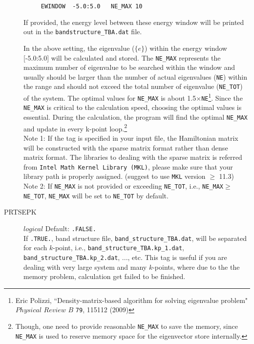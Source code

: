 \documentclass[a4paper,12pt]{scrartcl}
\makeatletter
\def\namedlabel#1#2{\begingroup
    #2%
    \def\@currentlabel{#2}%
    \phantomsection\label{#1}\endgroup
}
\makeatother
\begin{document}
\begin{description}
    \begin{verbatim}
     EWINDOW  -5.0:5.0   NE_MAX 10  
    \end{verbatim}

		If provided, the energy level between these energy window will be printed
		out in the \texttt{bandstructure\_TBA.dat} file. 

		In the above setting, the eigenvalue ($\{e\}$) within the energy window [-5.0:5.0] will be calculated and stored. The \texttt{NE\_MAX} represents the maximum number of eigenvalue to be searched within the window and usually should be larger than the number of actual eigenvalues (\texttt{NE}) within the range and should not exceed the total number of eigenvalue (\texttt{NE\_TOT}) of the system. The optimal values for \texttt{NE\_MAX} is about 1.5$\times$\texttt{NE}\footnote{Eric Polizzi, ``Density-matrix-based algorithm for solving eigenvalue problem" $Physical$ $Review$ $B$  \texttt{79}, 115112 (2009)}. Since the \texttt{NE\_MAX} is critical to the calculation speed, choosing the optimal values is essential. During the calculation, the program will find the optimal \texttt{NE\_MAX} and update in every k-point loop.\footnote{Though, one need to provide reasonable \texttt{NE\_MAX} to save the memory, since \texttt{NE\_MAX} is used to reserve memory space for the eigenvector store internally.}\\
		
      Note 1: If the tag is specified in your input file, the Hamiltonian matrix will be constructed with the sparse matrix format rather than dense matrix format. The libraries to dealing with the sparse matrix is referred from \texttt{Intel Math Kernel Library (MKL)}, please make sure that your library path is properly assigned. (suggest to use \texttt{MKL} version $\geq$ 11.3) \\
      
      Note 2: If \texttt{NE\_MAX} is not provided or exceeding \texttt{NE\_TOT}, i.e., \texttt{NE\_MAX}$\geq$\texttt{NE\_TOT}, \texttt{NE\_MAX} will be set to \texttt{NE\_TOT} by default. 
      
    \item[\namedlabel{tag:PRTSEPK}{PRTSEPK}] $logical$ Default: \texttt{.FALSE.} \\
		If \texttt{.TRUE.}, band structure file, \texttt{band\_structure\_TBA.dat}, will 
		be separated for each $k$-point, i.e., \texttt{band\_structure\_TBA.kp\_1.dat}, \texttt{band\_structure\_TBA.kp\_2.dat}, ..., etc. This tag is useful if you are dealing with very large system and many $k$-points, where due to the the memory problem, calculation get failed to be finished.


\end{description}
\end{document}
